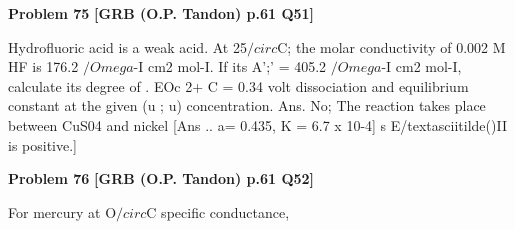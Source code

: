 \begin{problembox}
\textbf{Problem 75} \hfill \textbf{[GRB (O.P. Tandon) p.61 Q51]}
\label{q:ext-grb_all_questions-75}

Hydrofluoric acid is a weak acid. At 25$/circ$C; the molar 
conductivity of 0.002 M HF is 176.2 $/Omega$-I cm2 mol-I. If its 
A';' = 405.2 $/Omega$-I cm2 mol-I, 
calculate 
its 
degree 
of 
. 
EOc 2+ 
C = 0.34 volt 
dissociation 
and 
equilibrium 
constant 
at 
the 
given 
(u 
; u) 
concentration. 
Ans. No; The reaction takes place between CuS04 and nickel 
[Ans .. a= 0.435, K = 6.7 x 10-4] 
s E/textasciitilde()II is positive.]
\end{problembox}

\begin{problembox}
\textbf{Problem 76} \hfill \textbf{[GRB (O.P. Tandon) p.61 Q52]}
\label{q:ext-grb_all_questions-76}

For mercury at O$/circ$C specific conductance,
\end{problembox}

